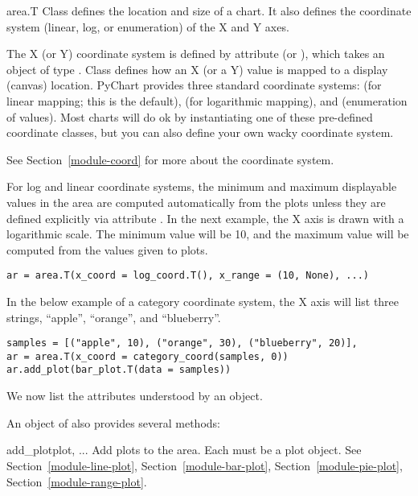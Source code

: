 \documentclass{howto}
\newcommand{\pychart}{PyChart}
\newcommand{\secref}[1]{Section~\ref{#1}}
\newcommand{\xref}[1]{See Section~\ref{#1}}
\begin{document}
\begin{classdesc*}{area.T}
Class  defines the location and size of a chart. It also
defines the coordinate system (linear, log, or enumeration) of the X and
Y axes.

The X (or Y) coordinate system is defined by attribute
 (or ), which takes an object
of type . Class  defines how an X (or a Y)
value is mapped to a display (canvas) location. \pychart{} provides
three standard coordinate systems:  (for linear
mapping; this is the default),  (for logarithmic
mapping), and  (enumeration of values). Most
charts will do ok by instantiating one of these pre-defined coordinate
classes, but you can also define your own wacky coordinate system.

\begin{seealso}
\xref{module-coord} for more about the coordinate system.
\end{seealso}

For log and linear coordinate systems, the minimum and maximum
displayable values in the area are computed automatically from the plots
unless they are defined explicitly via attribute .
In the next example, the X axis is drawn with a
logarithmic scale. The minimum value
will be 10, and the maximum value will be computed from the values given
to plots.

\begin{verbatim}
ar = area.T(x_coord = log_coord.T(), x_range = (10, None), ...)
\end{verbatim}

In the below example of a category coordinate system,
the X axis will list three strings,
``apple'', ``orange'', and ``blueberry''.

\begin{verbatim}
samples = [("apple", 10), ("orange", 30), ("blueberry", 20)],
ar = area.T(x_coord = category_coord(samples, 0))
ar.add_plot(bar_plot.T(data = samples))
\end{verbatim}
\end{classdesc*}

We now list the attributes understood by an  object.


An object of  also provides several methods:

\begin{methoddesc}{add_plot}{plot, ...}
Add plots to the area. Each  must be a plot object.
\xref{module-line-plot}, \secref{module-bar-plot},
\secref{module-pie-plot}, \secref{module-range-plot}.
\end{methoddesc}
\end{document}
